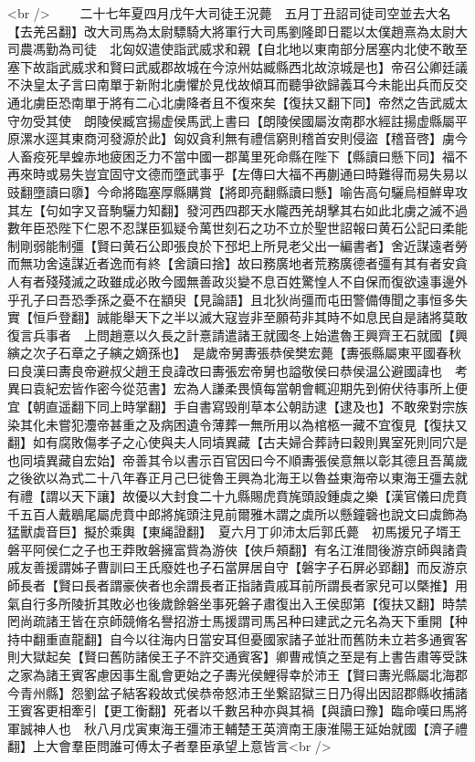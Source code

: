 <br />
　　二十七年夏四月戊午大司徒王況薨　五月丁丑詔司徒司空並去大名【去羌呂翻】改大司馬為太尉驃騎大將軍行大司馬劉隆即日罷以太僕趙熹為太尉大司農馮勤為司徒　北匈奴遣使詣武威求和親【自北地以東南部分居塞内北使不敢至塞下故詣武威求和賢曰武威郡故城在今涼州姑臧縣西北故涼城是也】帝召公卿廷議不決皇太子言曰南單于新附北虜懼於見伐故傾耳而聽爭欲歸義耳今未能出兵而反交通北虜臣恐南單于將有二心北虜降者且不復來矣【復扶又翻下同】帝然之告武威太守勿受其使　朗陵侯臧宫揚虚侯馬武上書曰【朗陵侯國屬汝南郡水經註揚虚縣屬平原漯水逕其東商河發源於此】匈奴貪利無有禮信窮則稽首安則侵盜【稽音啓】虜今人畜疫死旱蝗赤地疲困乏力不當中國一郡萬里死命縣在陛下【縣讀曰懸下同】福不再來時或易失豈宜固守文德而墮武事乎【左傳曰大福不再蒯通曰時難得而易失易以豉翻墮讀曰隳】今命將臨塞厚縣購賞【將即亮翻縣讀曰懸】喻告高句驪烏桓鮮卑攻其左【句如字又音駒驪力知翻】發河西四郡天水隴西羌胡擊其右如此北虜之滅不過數年臣恐陛下仁恩不忍謀臣狐疑令萬世刻石之功不立於聖世詔報曰黄石公記曰柔能制剛弱能制彊【賢曰黄石公即張良於下邳圯上所見老父出一編書者】舍近謀遠者勞而無功舍遠謀近者逸而有終【舍讀曰捨】故曰務廣地者荒務廣德者彊有其有者安貪人有者殘殘滅之政雖成必敗今國無善政災變不息百姓驚惶人不自保而復欲遠事邊外乎孔子曰吾恐季孫之憂不在顓臾【見論語】且北狄尚彊而屯田警備傳聞之事恒多失實【恒戶登翻】誠能舉天下之半以滅大寇豈非至願苟非其時不如息民自是諸將莫敢復言兵事者　上問趙憙以久長之計憙請遣諸王就國冬上始遣魯王興齊王石就國【興縯之次子石章之子縯之嫡孫也】　是歲帝舅夀張恭侯樊宏薨【夀張縣屬東平國春秋曰良漢曰夀良帝避叔父趙王良諱改曰夀張宏帝舅也謚敬侯曰恭侯温公避國諱也　考異曰袁紀宏皆作密今從范書】宏為人謙柔畏慎每當朝會輒迎期先到俯伏待事所上便宜【朝直遥翻下同上時掌翻】手自書寫毁削草本公朝訪逮【逮及也】不敢衆對宗族染其化未嘗犯灋帝甚重之及病困遺令薄葬一無所用以為棺柩一藏不宜復見【復扶又翻】如有腐敗傷孝子之心使與夫人同墳異藏【古夫婦合葬詩曰穀則異室死則同穴是也同墳異藏自宏始】帝善其令以書示百官因曰今不順夀張侯意無以彰其德且吾萬歲之後欲以為式二十八年春正月己巳徙魯王興為北海王以魯益東海帝以東海王彊去就有禮【謂以天下讓】故優以大封食二十九縣賜虎賁旄頭設鍾虡之樂【漢官儀曰虎賁千五百人戴鶡尾屬虎賁中郎將旄頭注見前爾雅木謂之虡所以懸鐘磬也說文曰虡飾為猛獸虡音巨】擬於乘輿【東䋲證翻】　夏六月丁卯沛太后郭氏薨　初馬援兄子壻王磐平阿侯仁之子也王莽敗磐擁富貲為游俠【俠戶頰翻】有名江淮間後游京師與諸貴戚友善援謂姊子曹訓曰王氏廢姓也子石當屏居自守【磐字子石屏必郢翻】而反游京師長者【賢曰長者謂豪俠者也余謂長者正指諸貴戚耳前所謂長者家兒可以槩推】用氣自行多所陵折其敗必也後歲餘磐坐事死磐子肅復出入王侯邸第【復扶又翻】時禁罔尚疏諸王皆在京師競脩名譽招游士馬援謂司馬呂种曰建武之元名為天下重開【种持中翻重直龍翻】自今以往海内日當安耳但憂國家諸子並壯而舊防未立若多通賓客則大獄起矣【賢曰舊防諸侯王子不許交通賓客】卿曹戒慎之至是有上書告肅等受誅之家為諸王賓客慮因事生亂會更始之子夀光侯鯉得幸於沛王【賢曰夀光縣屬北海郡今青州縣】怨劉盆子結客殺故式侯恭帝怒沛王坐繋詔獄三日乃得出因詔郡縣收捕諸王賓客更相牽引【更工衡翻】死者以千數呂种亦與其禍【與讀曰豫】臨命嘆曰馬將軍誠神人也　秋八月戊寅東海王彊沛王輔楚王英濟南王康淮陽王延始就國【濟子禮翻】上大會羣臣問誰可傅太子者羣臣承望上意皆言<br />
